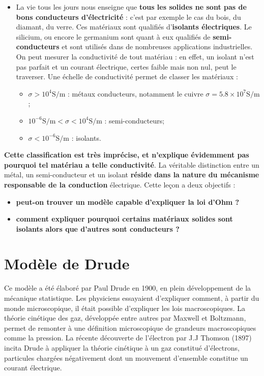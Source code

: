 \documentclass[11pt,a4paper]{report}
\begin{document}
\begin{itemize}
	\item La vie tous les jours nous enseigne que \textbf{tous les solides ne sont pas de bons conducteurs d'électricité} : c'est par exemple le cas du bois, du diamant, du verre. Ces matériaux sont qualifiés d'\textbf{isolants électriques}. Le silicium, ou encore le germanium sont quant à eux qualifiés de \textbf{semi-conducteurs} et sont utilisés dans de nombreuses applications industrielles. On peut mesurer la conductivité de tout matériau : en effet, un isolant n'est pas parfait et un courant électrique, certes faible mais non nul, peut le traverser. Une échelle de conductivité permet de classer les matériaux :
\begin{itemize}
	\item $\sigma > 10^4 \text{S}/\text{m}$ : métaux conducteurs, notamment le cuivre $\sigma = 5.8\times 10^7 \text{S}/\text{m}$;
	\item $10^{-6} \text{S}/\text{m} < \sigma < 10^4 \text{S}/\text{m}$ : semi-conducteurs;
	\item $\sigma < 10^{-6} \text{S}/\text{m}$ : isolants.\\
\end{itemize}
\end{itemize}

\textbf{Cette classification est très imprécise, et n'explique évidemment pas pourquoi tel matériau a telle conductivité}. La véritable distinction entre un métal, un semi-conducteur et un isolant \textbf{réside dans la nature du mécanisme responsable de la conduction} électrique. Cette leçon a deux objectifs :
\begin{itemize}
	\item \textbf{peut-on trouver un modèle capable d'expliquer la loi d'Ohm ?}
	\item \textbf{comment expliquer pourquoi certains matériaux solides sont isolants alors que d'autres sont conducteurs ?}\\
\end{itemize}

\newpage
\section{Modèle de Drude}

Ce modèle a été élaboré par Paul Drude en 1900, en plein développement de la mécanique statistique. Les physiciens essayaient d'expliquer comment, à partir du monde microscopique, il était possible d'expliquer les lois macroscopiques. La théorie cinétique des gaz, développée entre autres par Maxwell et Boltzmann, permet de remonter à une définition microscopique de grandeurs macroscopiques comme la pression. La récente découverte de l'électron par J.J Thomson (1897) incita Drude à appliquer la théorie cinétique à un gaz constitué d'électrons, particules chargées négativement dont un mouvement d'ensemble constitue un courant électrique.
\end{document}
